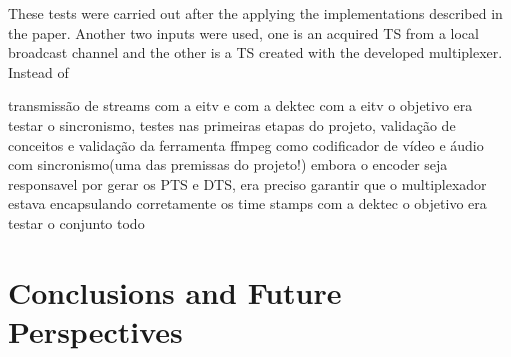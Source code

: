 \documentclass[
	12pt,				%
	openright,			%
	twoside,			%
	a4paper,			%
	brazil,
	french,				%
	english
	]{abntex2}
\begin{document}
These tests were carried out after the applying the implementations described in the paper. Another two inputs were used, one is an acquired TS from a local broadcast channel and the other is a TS created with the developed multiplexer. Instead of 


transmissão de streams com a eitv e com a dektec
	com a eitv o objetivo era testar o sincronismo, testes nas primeiras etapas do projeto, validação de conceitos e validação da ferramenta ffmpeg como codificador de vídeo e áudio com sincronismo(uma das premissas do projeto!) embora o encoder seja responsavel por gerar os PTS e DTS, era preciso garantir que o multiplexador estava encapsulando corretamente os time stamps
	com a dektec o objetivo era testar o conjunto todo

%


\chapter*[Conclusions and Future Perspectives]{Conclusions and Future Perspectives}







\postextual
\end{document}
